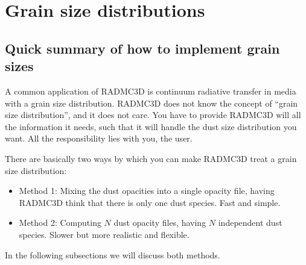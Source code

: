 \documentclass[letterpaper,10pt,english]{sphinxmanual}
\begin{document}
\section{Grain size distributions}
\label{\detokenize{dustradtrans:grain-size-distributions}}\label{\detokenize{dustradtrans:sec-grain-size-distributions}}

\subsection{Quick summary of how to implement grain sizes}
\label{\detokenize{dustradtrans:quick-summary-of-how-to-implement-grain-sizes}}\label{\detokenize{dustradtrans:sec-grain-size-distributions-overview}}
A common application of RADMC\sphinxhyphen{}3D is continuum radiative transfer in media with a
grain size distribution. RADMC\sphinxhyphen{}3D does not know the concept of “grain size
distribution”, and it does not care. You have to provide RADMC\sphinxhyphen{}3D will all the
information it needs, such that it will handle the dust size distribution you
want. All the responsibility lies with you, the user.

There are basically two ways by which you can make RADMC\sphinxhyphen{}3D treat a grain size
distribution:
\begin{itemize}
\item {} 
Method 1: Mixing the dust opacities into a single opacity file, having
RADMC\sphinxhyphen{}3D think that there is only one dust species. Fast and simple.

\item {} 
Method 2: Computing \(N\) dust opacity files, having \(N\) independent
dust species. Slower but more realistic and flexible.

\end{itemize}

In the following subsections we will discuss both methods.
\end{document}
